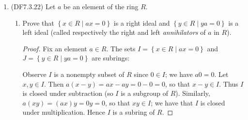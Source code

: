 \documentclass[11pt]{article}
\newcommand{\br}[1]{\left(#1\right)}
\newcommand{\cbr}[1]{\left\{#1\right\}}
\begin{document}
\begin{enumerate}
\begin{proof}
\[{\begin{pmatrix}
        \end{pmatrix}} = (r_1r_3 - r_2r_4) + (r_1r_4 + r_2r_3)i\] \[=(r_1+r_2i)(r_3+r_4i) = \varphi\br{r_1\begin{pmatrix}
            1 & 0 \\ 0 & 1
        \end{pmatrix} + r_2\begin{pmatrix}
            0 & -1 \\ 1 & 0 
        \end{pmatrix}}\varphi\br{r_3\begin{pmatrix}
            1 & 0 \\ 0 & 1
        \end{pmatrix} + r_4\begin{pmatrix}
            0 & -1 \\ 1 & 0 
        \end{pmatrix}}.\]

        The map $\varphi^{-1}\colon \mathbb{C}\to S$ given by \[\varphi^{-1}(r_1+r_2i) = r_1\begin{pmatrix}
            1 & 0 \\ 0 & 1
        \end{pmatrix} + r_2\begin{pmatrix}
            0 & -1 \\ 1 & 0 
        \end{pmatrix}\] is easily checked to be a two-sided inverse for $\varphi$. We have that $\varphi\varphi^{-1}$ is the identity map on $\mathbb{C}$ and that $\varphi^{-1}\varphi$ is the identity map on $S$. It follows that $\varphi$ is a bijection, and so $\varphi$ is an isomorphism of rings. Hence $S$ is isomorphic to $\mathbb{C}$ as desired.
    \end{proof}
    \item (DF7.3.22) Let $a$ be an element of the ring $R$. \begin{enumerate}[label=\textbf{(\alph*)}]
        \item Prove that $\cbr{x\in R\mid ax = 0}$ is a right ideal and $\cbr{y\in R\mid ya = 0}$ is a left ideal (called respectively the right and left \textit{annihilators} of $a$ in $R$).
        \begin{proof}
            Fix an element $a\in R$. The sets $I = \cbr{x\in R\mid ax = 0}$ and $J = \cbr{y\in R\mid ya = 0}$ are subrings:
            
            Observe $I$ is a nonempty subset of $R$ since $0\in I$; we have $a0=0$. Let $x,y\in I$. Then $a(x-y) = ax - ay = 0-0 = 0$, so that $x-y\in I$. Thus $I$ is closed under subtraction (so $I$ is a subgroup of $R$). Similarly, $a(xy) = (ax)y = 0y = 0$, so that $xy\in I$; we have that $I$ is closed under multiplication. Hence $I$ is a subring of $R$.


\end{proof}
\end{enumerate}
\end{enumerate}
\end{document}
